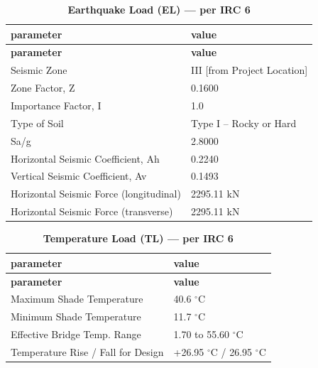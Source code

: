\documentclass[12pt,a4paper]{report}
\numberwithin{table}{chapter}
\numberwithin{figure}{chapter}
\newcommand{\ReportTableRowGap}{6pt}
\begin{document}
\vspace{1em}
\begin{longtable}{|L{5.5cm}|p{10.0cm}|}
\caption{\textbf{Earthquake Load (EL) --- per IRC 6}}\\
\hline
\textbf{parameter} & \textbf{value} \\
\hline
\endfirsthead
\hline
\textbf{parameter} & \textbf{value} \\
\hline
\endhead

\textnormal{Seismic Zone} & III [from Project Location] \\[\ReportTableRowGap]
\hline
\textnormal{Zone Factor, Z} & 0.1600 \\[\ReportTableRowGap]
\hline
\textnormal{Importance Factor, I} & 1.0 \\[\ReportTableRowGap]
\hline
\textnormal{Type of Soil} & Type I – Rocky or Hard \\[\ReportTableRowGap]
\hline
\textnormal{Sa/g} & 2.8000 \\[\ReportTableRowGap]
\hline
\textnormal{Horizontal Seismic Coefficient, Ah} & 0.2240 \\[\ReportTableRowGap]
\hline
\textnormal{Vertical Seismic Coefficient, Av} & 0.1493 \\[\ReportTableRowGap]
\hline
\textnormal{Horizontal Seismic Force (longitudinal)} & 2295.11 kN \\[\ReportTableRowGap]
\hline
\textnormal{Horizontal Seismic Force (transverse)} & 2295.11 kN \\[\ReportTableRowGap]
\hline
\end{longtable}

\vspace{1em}
\begin{longtable}{|L{5.5cm}|p{10.0cm}|}
\caption{\textbf{Temperature Load (TL) --- per IRC 6}}\\
\hline
\textbf{parameter} & \textbf{value} \\
\hline
\endfirsthead
\hline
\textbf{parameter} & \textbf{value} \\
\hline
\endhead

\textnormal{Maximum Shade Temperature} & 40.6 $^\circ$C \\[\ReportTableRowGap]
\hline
\textnormal{Minimum Shade Temperature} & 11.7 $^\circ$C \\[\ReportTableRowGap]
\hline
\textnormal{Effective Bridge Temp. Range} & 1.70 to 55.60 $^\circ$C \\[\ReportTableRowGap]
\hline
\textnormal{Temperature Rise / Fall for Design} & +26.95 $^\circ$C / \textminus{}26.95 $^\circ$C \\[\ReportTableRowGap]
\hline
\end{longtable}
\end{document}

